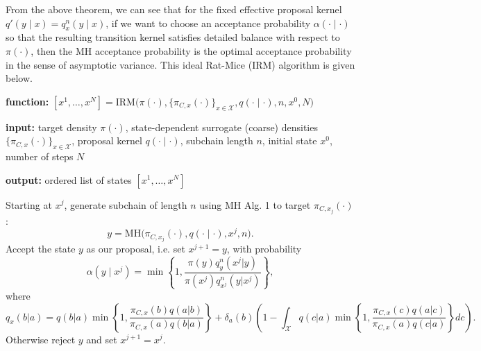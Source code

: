 \documentclass[12pt]{article}
\theoremstyle{definition}
\theoremstyle{remark}
\theoremstyle{plain}
\begin{document}
From the above theorem, we can see that for the fixed effective proposal kernel 
$q'(y\mid x) = q_x^n(y\mid x)$, 
if we want to choose an acceptance probability $\alpha(\cdot\mid\cdot)$ so that 
the resulting transition kernel satisfies detailed balance with respect to $\pi(\cdot)$,
then the MH acceptance probability is the optimal acceptance probability in the sense of asymptotic variance.
This ideal Rat-Mice (IRM) algorithm is given below.

\begin{algorithm}[H]
  \caption{Ideal Rat-Mice (IRM)}
  \label{alg:irm}
  \textbf{function:} $[x^1,\ldots,x^N] =
  \mathrm{IRM}\bigl(\pi(\cdot), \{\pi_{C,x}(\cdot)\}_{x \in \mathcal{X}}, q(\cdot\mid\cdot), n, x^0, N\bigr)$
  
  \textbf{input:} target density $\pi(\cdot)$, state-dependent surrogate (coarse) densities $\{\pi_{C,x}(\cdot)\}_{x \in \mathcal{X}}$, 
  proposal kernel $q(\cdot\mid\cdot)$, subchain length $n$, initial state $x^0$, number of steps $N$
  
  \textbf{output:} ordered list of states $[x^1,\ldots,x^N]$
  
  \begin{algorithmic}[1]
      \State Starting at $x^j$, generate subchain of length $n$ using MH Alg. 1 to target $\pi_{C, x_j}(\cdot)$:
      \[
          y = \mathrm{MH}\bigl(\pi_{C, x_j}(\cdot), q(\cdot\mid\cdot), x^j, n\bigr).
      \]
      \State Accept the state $y$ as our proposal, i.e. set $x^{j+1} = y$, with probability
      \[
          \alpha(y \mid x^j)
          =
          \min\left\{1, \frac{\pi(y)q_y^n(x^j|y)}{\pi(x^j)q_{x^j}^n(y|x^j)}\right\},
      \]
      where 
      \[
        q_x(b|a) = q(b|a) \min\left\{1, \frac{\pi_{C,x}(b)q(a|b)}{\pi_{C,x}(a)q(b|a)}\right\} + \delta_a(b)\left(1 - \int_\mathcal X q(c|a) \min\left\{1, \frac{\pi_{C,x}(c)q(a|c)}{\pi_{C,x}(a)q(c|a)}\right\} dc\right).
      \]
      \State Otherwise reject $y$ and set $x^{j+1} = x^j$.
  \EndFor
  \end{algorithmic}
\end{algorithm}
\end{document}
